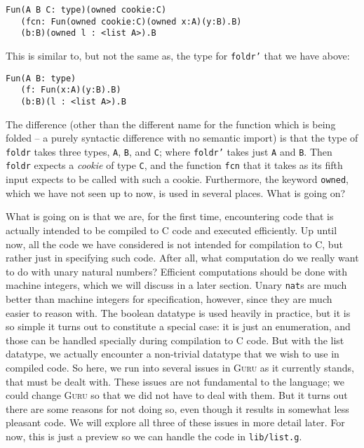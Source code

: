 \documentclass{book}[12pt]
\newcommand{\guru}[0]{\textsc{Guru}\xspace}
\begin{document}
\begin{verbatim}
Fun(A B C: type)(owned cookie:C)
   (fcn: Fun(owned cookie:C)(owned x:A)(y:B).B)
   (b:B)(owned l : <list A>).B
\end{verbatim}

\noindent This is similar to, but not the same as, the type for
\texttt{foldr'} that we have above:

\begin{verbatim}
Fun(A B: type)
   (f: Fun(x:A)(y:B).B)
   (b:B)(l : <list A>).B
\end{verbatim}

\noindent The difference (other than the different name for the
function which is being folded -- a purely syntactic difference with
no semantic import) is that the type of \texttt{foldr} takes three
types, \texttt{A}, \texttt{B}, and \texttt{C}; where \texttt{foldr'}
takes just \texttt{A} and \texttt{B}.  Then \texttt{foldr} expects a
\emph{cookie} of type \texttt{C}, and the function \texttt{fcn} that
it takes as its fifth input expects to be called with such a cookie. 
Furthermore, the keyword \texttt{owned}, which we have not seen up to
now, is used in several places.  What is going on?

What is going on is that we are, for the first time, encountering code
that is actually intended to be compiled to C code and executed
efficiently.  Up until now, all the code we have considered is not
intended for compilation to C, but rather just in specifying such
code.  After all, what computation do we really want to do with unary
natural numbers?  Efficient computations should be done with machine
integers, which we will discuss in a later section.  Unary
\texttt{nat}s are much better than machine integers for specification,
however, since they are much easier to reason with.  The boolean
datatype is used heavily in practice, but it is so simple it turns out
to constitute a special case: it is just an enumeration, and those can
be handled specially during compilation to C code.  But with the list
datatype, we actually encounter a non-trivial datatype that we wish to
use in compiled code.  So here, we run into several issues in \guru as
it currently stands, that must be dealt with.  These issues are not
fundamental to the language; we could change \guru so that we did not
have to deal with them.  But it turns out there are some reasons for
not doing so, even though it results in somewhat less pleasant code.
We will explore all three of these issues in more detail later.  For
now, this is just a preview so we can handle the code in
\texttt{lib/list.g}.
\end{document}
